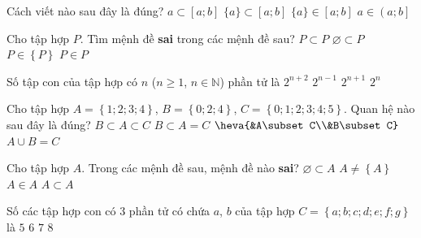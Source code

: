 \begin{ex}%
	Cách viết nào sau đây  là đúng?
	 \choice
		{$a\subset \left[a;b\right]$} 
		{\True $\{a\}\subset \left[a;b\right]$} 
		{$\{a\}\in \left[a;b\right]$} 
		 {$a\in \left(a;b\right]$}
\end{ex}

\begin{ex}%
	Cho tập hợp $P$. Tìm mệnh đề \textbf{sai} trong các mệnh đề sau? 
	\choice 
		{$P\subset P$} 
		 {$\varnothing \subset P$}
		{$P\in \left\{P\right\}$} 
		 {\True $P\in P$}
\end{ex}

\begin{ex}%
	Số tập con của tập hợp có  $n$ ($n\ge 1$, $n\in \mathbb{N}$) phần tử là
	\choice 
		 {$2^{n+2}$}
		 {$2^{n-1}$}
		 {$2^{n+1}$}
		{\True  $2^n$}
\end{ex}

\begin{ex}%
	Cho tập hợp $A=\left\{1;2;3;4\right\}$, $B=\left\{0;2;4\right\}$, $C=\left\{0;1;2;3;4;5\right\}$. Quan hệ  nào sau đây là đúng?
	\choice 
		{$B\subset A\subset  C$}
		 {$B\subset A=C$}
		{\True $\heva{&A\subset  C\\&B\subset C}$}
		 {$A\cup B=C$}
\end{ex}

\begin{ex}%
	Cho  tập hợp $A$. Trong các mệnh đề sau, mệnh đề nào \textbf{sai}?
	\choice 
		{$\varnothing \subset A$} 
		{$A\ne  \left\{A\right\}$}
		{\True  $A\in A$}
		{$A\subset A$} 
\end{ex}

\begin{ex}%
	Số các tập  hợp con có $3$ phần tử có chứa $a$, $b$ của tập hợp $C=\left\{a;b;c;d;e;f;g\right\}$ là
	 \choice
		{\True $5$} 
		 {$6$}
		{$7$} 
		{$8$} 
\end{ex}

